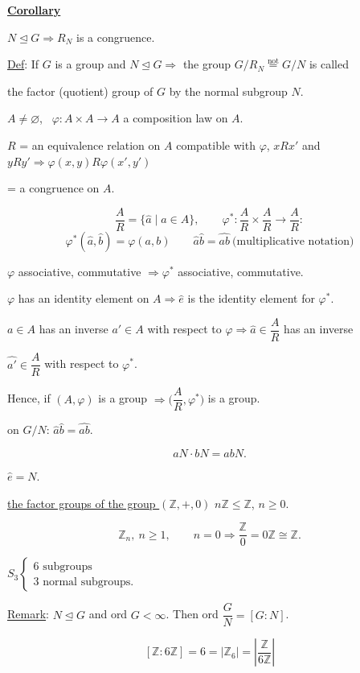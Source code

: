 \documentclass[12pt]{article}
\begin{document}
\noindent\underline{\textbf{Corollary}}

\bigskip
\noindent $N\trianglelefteq G \Rightarrow R_N$ is a congruence.

\bigskip
\noindent\underline{Def}: If $G$ is a group and $N\trianglelefteq G \Rightarrow$ the group $G/R_N \overset{\text{not}}{=} G/N$ is called

\noindent the factor (quotient) group of $G$ by the normal subgroup $N$.

\bigskip
\noindent $A\neq\varnothing$, \ $\varphi: A\times A\to A$ a composition law on $A$.

\noindent $R$ = an equivalence relation on $A$ compatible with $\varphi$, \quad $xRx'$ and $yRy' \Rightarrow \varphi(x,y)R\varphi(x',y')$

\noindent = a congruence on $A$.

\[
\frac{A}{R} = \{\hat a \mid a\in A\}, \qquad \varphi^*: \frac{A}{R}\times\frac{A}{R} \to \frac{A}{R}:
\]
\[
\varphi^*(\hat a,\hat b) = \varphi(a,b) \qquad \hat a\hat b=\widehat{ab} \ \text{(multiplicative notation)}
\]

\bigskip
\noindent $\varphi$ associative, commutative $\Rightarrow \varphi^*$ associative, commutative.

\noindent $\varphi$ has an identity element on $A \Rightarrow \hat e$ is the identity element for $\varphi^*$.

\noindent $a\in A$ has an inverse $a'\in A$ with respect to $\varphi \Rightarrow \hat a\in \dfrac{A}{R}$ has an inverse

\noindent $\hat{a'}\in \dfrac{A}{R}$ with respect to $\varphi^*$.

\bigskip
\noindent Hence, if $(A,\varphi)$ is a group $\Rightarrow \Big(\dfrac{A}{R},\varphi^*\Big)$ is a group.

\bigskip
\noindent on $G/N$: \quad $\hat a\hat b = \widehat{ab}$.

\[
aN\cdot bN = abN.
\]

\noindent $\hat e = N$.

\bigskip
\noindent\underline{the factor groups of the group $(\mathbb{Z},+,0)$} \quad $n\mathbb{Z}\leq \mathbb{Z}$, $n\geq 0$.

\[
\mathbb{Z}_n, \ n\geq 1, \qquad n=0 \Rightarrow \frac{\mathbb{Z}}{0} = 0\mathbb{Z} \cong \mathbb{Z}.
\]

\noindent $S_3 \begin{cases} 6 \text{ subgroups} \\ 3 \text{ normal subgroups.} \end{cases}$

\bigskip
\noindent\underline{Remark}: $N\trianglelefteq G$ and ord $G<\infty$. Then ord $\dfrac{G}{N} = [G:N]$.

\[
[\mathbb{Z}:6\mathbb{Z}] = 6 = |\mathbb{Z}_6| = \left|\frac{\mathbb{Z}}{6\mathbb{Z}}\right|
\]
\end{document}
